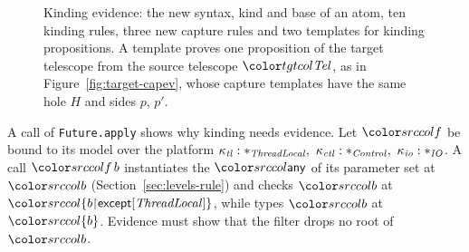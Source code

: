 \begin{figure}[tp]
\color{black}
\caption{Kinding evidence: the new syntax, kind and base of an atom, ten kinding rules, three new capture rules and two templates for kinding propositions. A template proves one proposition of the target telescope from the source telescope $\tel$, as in Figure~\ref{fig:target-capev}, whose capture templates have the same hole $H$ and sides $p$, $p'$.}
\label{fig:cl-kinding}
\end{figure}

A call of \lstinline{Future.apply} shows why kinding needs evidence. Let $\src{f}$ be bound to its model over the platform $\kappa_{\mathit{tl}} : \ast_{\mathit{ThreadLocal}},\ \kappa_{\mathit{ctl}} : \ast_{\mathit{Control}},\ \kappa_{\mathit{io}} : \ast_{\mathit{IO}}$. A call $\src{f\,b}$ instantiates the $\cany$ of its parameter set at $\src{b}$ (Section~\ref{sec:levels-rule}) and checks $\src{b}$ at $\src{\cset{\restr{b}{\kexcept{\mathit{ThreadLocal}}}}}$, while  types $\src{b}$ at $\src{\cset{b}}$. Evidence must show that the filter drops no root of $\src{b}$.


